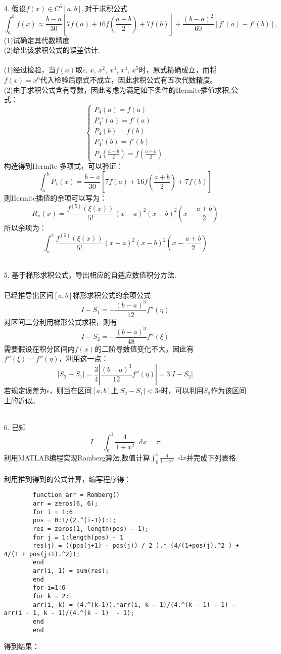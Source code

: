\documentclass{article}
\newcommand*{\dif}{\mathop{}\!\mathrm{d}}
\begin{document}
\begin{itemize}
		\item[4.]假设$f(x) \in C^5[a, b],$对于求积公式
		$$\int_{a}^{b}f(x)\approx\frac{b - a}{30}\left[7f(a) + 16f\left(\frac{a+b}{2}\right) + 7f(b)\right] +\frac{(b - a)^2}{60}\left[f'(a) -f'(b)\right],$$
		(1)试确定其代数精度\\
		(2)给出该求积公式的误差估计.\\
		\\
		(1)经过检验，当$f(x)$取$c,\,x,\,x^2,\,x^3,\,x^4,\,x^5$时，原式精确成立，而将$f(x) = x^6$代入检验后原式不成立，因此求积公式有五次代数精度。\\
		(2)由于求积公式含有导数，因此考虑为满足如下条件的Hermite插值求积,公式：
		$$
			\left\{
			\begin{array}{lcl}
			P_4(a) = f(a)\\
			P_4'(a) = f'(a)\\
			P_4(b) = f(b)\\
			P_4'(b) = f'(b)\\
			P_4(\frac{a+b}{2}) = f(\frac{a+b}{2})
			\end{array}
			\right.
		$$
		构造得到Hermite 多项式，可以验证：
		$$\int_{a}^{b}P_4(x) =\frac{b - a}{30}\left[7f(a) + 16f\left(\frac{a+b}{2}\right) + 7f(b)\right]$$
		则Hermite插值的余项可以写为：
		$$
			R_n(x) = \frac{f^{(5)}(\xi(x))}{5!}(x-a)^2(x-b)^2(x-\frac{a+b}{2})
		$$
		所以余项为：
		$$
			\int_{a}^{b}\frac{f^{(5)}(\xi(x))}{5!}(x-a)^2(x-b)^2(x-\frac{a+b}{2})
		$$\\
		
		\item[5.]基于梯形求积公式，导出相应的自适应数值积分方法.\\
		\\
		已经推导出区间$[a, b]$梯形求积公式的余项公式
		$$I - S_1 = -\frac{(b-a)^3}{12}f''(\eta)$$
		对区间二分利用梯形公式求积，则有
		$$I - S_2 = -\frac{(b-a)^3}{48}f''(\xi)$$
		需要假设在积分区间内$f(x)$的二阶导数值变化不大，因此有$f''(\xi) = f''(\eta)$，利用这一点：
		$$\left|S_2 - S_1\right| = \frac{3}{4}\left|\frac{(b-a)^3}{12}f''(\eta)\right| = 3\left|I - S_2\right|$$
		若规定误差为$\epsilon$，则当在区间$[a,b]$上$|S_2 - S_1| < 3\epsilon$时，可以利用$S_2$作为该区间上的近似。\\
		\\
		
		\item[6.]已知
		$$I = \int_{0}^{1}\frac{4}{1 + x^2}\dif x = \pi$$
		利用MATLAB编程实现Romberg算法,数值计算$\int_{0}^{1}\frac{4}{1 + x^2}\dif x$并完成下列表格.\\
		\\
		利用推到得到的公式计算，编写程序得：
		\begin{lstlisting}
		function arr = Romberg()
		arr = zeros(6, 6);
		for i = 1:6
		pos = 0:1/(2.^(i-1)):1;
		res = zeros(1, length(pos) - 1);
		for j = 1:length(pos) - 1
		res(j) = ((pos(j+1) - pos(j)) / 2 ).* (4/(1+pos(j).^2 ) + 4/(1 + pos(j+1).^2));
		end
		arr(i, 1) = sum(res);
		end
		for i=1:6
		for k = 2:i
		arr(i, k) = (4.^(k-1)).*arr(i, k - 1)/(4.^(k - 1) - 1) - arr(i - 1, k - 1)/(4.^(k - 1)  - 1);
		end
		end
	\end{lstlisting}
		得到结果：\\\\
		

\end{itemize}
\end{document}
